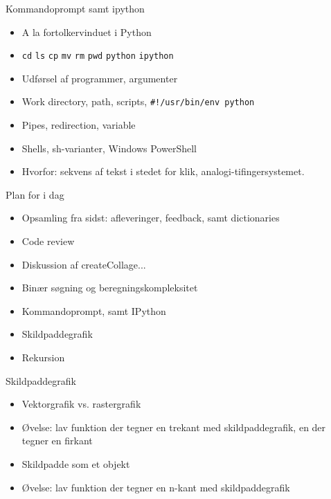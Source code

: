 \documentclass[a4paper,landscape]{slides}
\begin{document}
\begin{slide}
	\begin{center} {\large 
            Kommandoprompt samt ipython
	} \end{center}
	\begin{itemize} \addtolength{\itemsep}{-\baselineskip}
                \item A la fortolkervinduet i Python
                \item \verb|cd| \verb|ls| \verb|cp| \verb|mv| \verb|rm| \verb|pwd| \verb|python| \verb|ipython|
                \item Udførsel af programmer, argumenter
                \item Work directory, path, scripts, \verb|#!/usr/bin/env python|
                \item Pipes, redirection, variable
                \item Shells, sh-varianter, Windows PowerShell
                \item Hvorfor: sekvens af tekst i stedet for klik, analogi-tifingersystemet.
	\end{itemize}
\end{slide}

\begin{slide}
	\begin{center} {\large 
            Plan for i dag
	} \end{center}
	\begin{itemize} \addtolength{\itemsep}{-\baselineskip}
		\item Opsamling fra sidst: afleveringer, feedback, samt dictionaries
                \item Code review
		\item Diskussion af createCollage...
                \item Binær søgning og beregningskompleksitet
		\item Kommandoprompt, samt IPython
		\item Skildpaddegrafik 
                \item Rekursion
	\end{itemize}
\end{slide}

\begin{slide}
	\begin{center} {\large 
            Skildpaddegrafik
	} \end{center}
	\begin{itemize} \addtolength{\itemsep}{-\baselineskip}
                \item Vektorgrafik vs. rastergrafik
		\item Øvelse: lav funktion der tegner en trekant med skildpaddegrafik, en der tegner en firkant
                \item Skildpadde som et objekt
		\item Øvelse: lav funktion der tegner en n-kant med skildpaddegrafik
	\end{itemize}
\end{slide}
\end{document}
